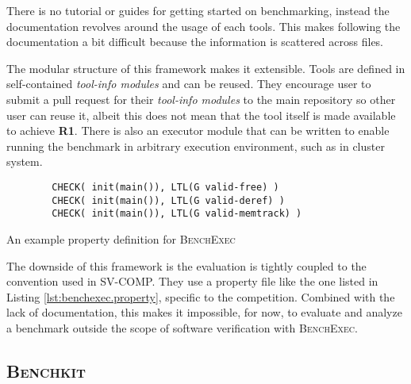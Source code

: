 
There is no tutorial or guides for getting started on benchmarking, instead the documentation revolves around the usage of each tools.
This makes following the documentation a bit difficult because the information is scattered across files.

The modular structure of this framework makes it extensible.
Tools are defined in self-contained \textit{tool-info modules} and can be reused.
They encourage user to submit a pull request for their \textit{tool-info modules} to the main repository so other user can reuse it, albeit this does not mean that the tool itself is made available to achieve \textbf{R1}.
There is also an executor module that can be written to enable running the benchmark in arbitrary execution environment, such as in cluster system.

\begin{listing}
    \begin{verbatim}
        CHECK( init(main()), LTL(G valid-free) )
        CHECK( init(main()), LTL(G valid-deref) )
        CHECK( init(main()), LTL(G valid-memtrack) )
    \end{verbatim}
    \caption{An example property definition for \textsc{BenchExec}}
    \label{lst:benchexec.property}
\end{listing}

The downside of this framework is the evaluation is tightly coupled to the convention used in SV-COMP.
They use a property file like the one listed in Listing \ref{lst:benchexec.property}, specific to the competition.
Combined with the lack of documentation, this makes it impossible, for now, to evaluate and analyze a benchmark outside the scope of software verification with \textsc{BenchExec}.


\subsection{\textsc{Benchkit}}

